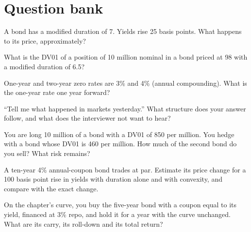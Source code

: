 \section{Question bank}

\begin{interviewq}\label{iq:iv:fixed-income-and-markets:1}
A bond has a modified duration of 7. Yields rise 25 basis points. What happens to its price, approximately?
\end{interviewq}

\begin{interviewq}\label{iq:iv:fixed-income-and-markets:2}
What is the DV01 of a position of 10 million nominal in a bond priced at 98 with a modified duration of 6.5?
\end{interviewq}

\begin{interviewq}\label{iq:iv:fixed-income-and-markets:3}
One-year and two-year zero rates are 3\% and 4\% (annual compounding). What is the one-year rate one year forward?
\end{interviewq}

\begin{interviewq}\label{iq:iv:fixed-income-and-markets:4}
``Tell me what happened in markets yesterday.'' What structure does your answer follow, and what does the interviewer
not want to hear?
\end{interviewq}

\begin{interviewq}\label{iq:iv:fixed-income-and-markets:5}
You are long 10 million of a bond with a DV01 of 850 per million. You hedge with a bond whose DV01 is 460 per million.
How much of the second bond do you sell? What risk remains?
\end{interviewq}

\begin{interviewq}\label{iq:iv:fixed-income-and-markets:6}
A ten-year 4\% annual-coupon bond trades at par. Estimate its price change for a 100 basis point rise in yields with
duration alone and with convexity, and compare with the exact change.
\end{interviewq}

\begin{interviewq}\label{iq:iv:fixed-income-and-markets:7}
On the chapter's curve, you buy the five-year bond with a coupon equal to its yield, financed at 3\% repo, and hold it for a
year with the curve unchanged. What are its carry, its roll-down and its total return?
\end{interviewq}

